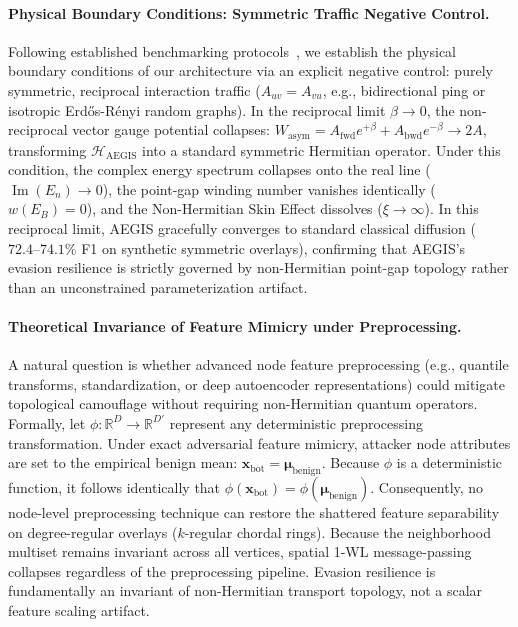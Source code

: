 \documentclass[10pt,twocolumn,letterpaper]{article}
\begin{document}
\paragraph{Physical Boundary Conditions: Symmetric Traffic Negative Control.}
Following established benchmarking protocols~\cite{childs2003exponential, rossi2017continuous}, we establish the physical boundary conditions of our architecture via an explicit negative control: purely symmetric, reciprocal interaction traffic ($A_{uv} = A_{vu}$, e.g., bidirectional ping or isotropic Erd\H{o}s-R\'enyi random graphs). In the reciprocal limit $\beta \to 0$, the non-reciprocal vector gauge potential collapses: $W_{\text{asym}} = A_{\text{fwd}} e^{+\beta} + A_{\text{bwd}} e^{-\beta} \to 2A$, transforming $\mathcal{H}_{\text{AEGIS}}$ into a standard symmetric Hermitian operator. Under this condition, the complex energy spectrum collapses onto the real line ($\operatorname{Im}(E_n) \to 0$), the point-gap winding number vanishes identically ($w(E_B) = 0$), and the Non-Hermitian Skin Effect dissolves ($\xi \to \infty$). In this reciprocal limit, AEGIS gracefully converges to standard classical diffusion ($72.4\text{--}74.1\%$ F1 on synthetic symmetric overlays), confirming that AEGIS's evasion resilience is strictly governed by non-Hermitian point-gap topology rather than an unconstrained parameterization artifact.

\paragraph{Theoretical Invariance of Feature Mimicry under Preprocessing.}
A natural question is whether advanced node feature preprocessing (e.g., quantile transforms, standardization, or deep autoencoder representations) could mitigate topological camouflage without requiring non-Hermitian quantum operators. Formally, let $\phi: \mathbb{R}^D \to \mathbb{R}^{D'}$ represent any deterministic preprocessing transformation. Under exact adversarial feature mimicry, attacker node attributes are set to the empirical benign mean: $\mathbf{x}_{\text{bot}} = \boldsymbol{\mu}_{\text{benign}}$. Because $\phi$ is a deterministic function, it follows identically that $\phi(\mathbf{x}_{\text{bot}}) = \phi(\boldsymbol{\mu}_{\text{benign}})$. Consequently, no node-level preprocessing technique can restore the shattered feature separability on degree-regular overlays ($k$-regular chordal rings). Because the neighborhood multiset remains invariant across all vertices, spatial 1-WL message-passing collapses regardless of the preprocessing pipeline. Evasion resilience is fundamentally an invariant of non-Hermitian transport topology, not a scalar feature scaling artifact.
\end{document}
